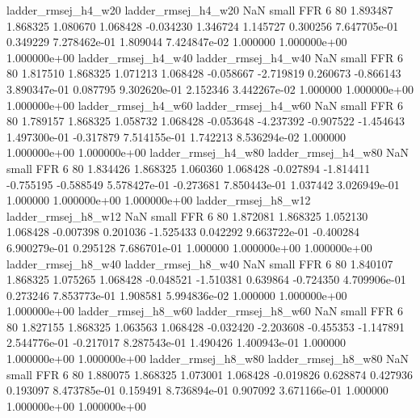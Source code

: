      ladder_rmsej_h4_w20      ladder_rmsej_h4_w20                   NaN      small      FFR                 6 80 1.893487       1.868325 1.080670       1.068428   -0.034230      1.346724      1.145727     0.300256   7.647705e-01  0.349229 7.278462e-01     1.809044   7.424847e-02            1.000000    1.000000e+00        1.000000e+00
     ladder_rmsej_h4_w40      ladder_rmsej_h4_w40                   NaN      small      FFR                 6 80 1.817510       1.868325 1.071213       1.068428   -0.058667     -2.719819      0.260673    -0.866143   3.890347e-01  0.087795 9.302620e-01     2.152346   3.442267e-02            1.000000    1.000000e+00        1.000000e+00
     ladder_rmsej_h4_w60      ladder_rmsej_h4_w60                   NaN      small      FFR                 6 80 1.789157       1.868325 1.058732       1.068428   -0.053648     -4.237392     -0.907522    -1.454643   1.497300e-01 -0.317879 7.514155e-01     1.742213   8.536294e-02            1.000000    1.000000e+00        1.000000e+00
     ladder_rmsej_h4_w80      ladder_rmsej_h4_w80                   NaN      small      FFR                 6 80 1.834426       1.868325 1.060360       1.068428   -0.027894     -1.814411     -0.755195    -0.588549   5.578427e-01 -0.273681 7.850443e-01     1.037442   3.026949e-01            1.000000    1.000000e+00        1.000000e+00
     ladder_rmsej_h8_w12      ladder_rmsej_h8_w12                   NaN      small      FFR                 6 80 1.872081       1.868325 1.052130       1.068428   -0.007398      0.201036     -1.525433     0.042292   9.663722e-01 -0.400284 6.900279e-01     0.295128   7.686701e-01            1.000000    1.000000e+00        1.000000e+00
     ladder_rmsej_h8_w40      ladder_rmsej_h8_w40                   NaN      small      FFR                 6 80 1.840107       1.868325 1.075265       1.068428   -0.048521     -1.510381      0.639864    -0.724350   4.709906e-01  0.273246 7.853773e-01     1.908581   5.994836e-02            1.000000    1.000000e+00        1.000000e+00
     ladder_rmsej_h8_w60      ladder_rmsej_h8_w60                   NaN      small      FFR                 6 80 1.827155       1.868325 1.063563       1.068428   -0.032420     -2.203608     -0.455353    -1.147891   2.544776e-01 -0.217017 8.287543e-01     1.490426   1.400943e-01            1.000000    1.000000e+00        1.000000e+00
     ladder_rmsej_h8_w80      ladder_rmsej_h8_w80                   NaN      small      FFR                 6 80 1.880075       1.868325 1.073001       1.068428   -0.019826      0.628874      0.427936     0.193097   8.473785e-01  0.159491 8.736894e-01     0.907092   3.671166e-01            1.000000    1.000000e+00        1.000000e+00
